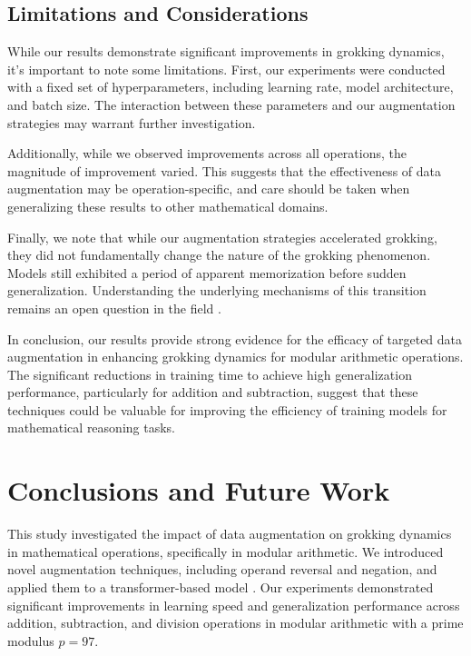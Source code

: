 \documentclass{article} %
\begin{document}
\subsection{Limitations and Considerations}

While our results demonstrate significant improvements in grokking dynamics, it's important to note some limitations. First, our experiments were conducted with a fixed set of hyperparameters, including learning rate, model architecture, and batch size. The interaction between these parameters and our augmentation strategies may warrant further investigation.

Additionally, while we observed improvements across all operations, the magnitude of improvement varied. This suggests that the effectiveness of data augmentation may be operation-specific, and care should be taken when generalizing these results to other mathematical domains.

Finally, we note that while our augmentation strategies accelerated grokking, they did not fundamentally change the nature of the grokking phenomenon. Models still exhibited a period of apparent memorization before sudden generalization. Understanding the underlying mechanisms of this transition remains an open question in the field \cite{power2022grokking}.

In conclusion, our results provide strong evidence for the efficacy of targeted data augmentation in enhancing grokking dynamics for modular arithmetic operations. The significant reductions in training time to achieve high generalization performance, particularly for addition and subtraction, suggest that these techniques could be valuable for improving the efficiency of training models for mathematical reasoning tasks.

\section{Conclusions and Future Work}
\label{sec:conclusion}

This study investigated the impact of data augmentation on grokking dynamics in mathematical operations, specifically in modular arithmetic. We introduced novel augmentation techniques, including operand reversal and negation, and applied them to a transformer-based model \cite{vaswani2017attention}. Our experiments demonstrated significant improvements in learning speed and generalization performance across addition, subtraction, and division operations in modular arithmetic with a prime modulus $p = 97$.
\end{document}
